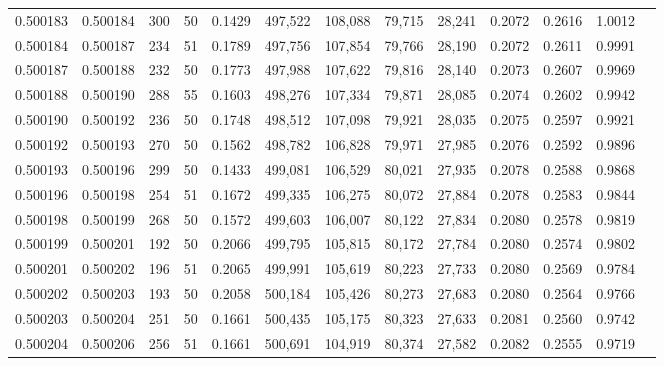 \begin{tabular}{rrrrrrrrrrrrr}
0.500183 & 0.500184 & 300 &  50 &                                     0.1429 & 497,522 & 108,088 &  79,715 &  28,241 & 0.2072 & 0.2616 & 1.0012 \\
0.500184 & 0.500187 & 234 &  51 &                                     0.1789 & 497,756 & 107,854 &  79,766 &  28,190 & 0.2072 & 0.2611 & 0.9991 \\
0.500187 & 0.500188 & 232 &  50 &                                     0.1773 & 497,988 & 107,622 &  79,816 &  28,140 & 0.2073 & 0.2607 & 0.9969 \\
0.500188 & 0.500190 & 288 &  55 &                                     0.1603 & 498,276 & 107,334 &  79,871 &  28,085 & 0.2074 & 0.2602 & 0.9942 \\
0.500190 & 0.500192 & 236 &  50 &                                     0.1748 & 498,512 & 107,098 &  79,921 &  28,035 & 0.2075 & 0.2597 & 0.9921 \\
0.500192 & 0.500193 & 270 &  50 &                                     0.1562 & 498,782 & 106,828 &  79,971 &  27,985 & 0.2076 & 0.2592 & 0.9896 \\
0.500193 & 0.500196 & 299 &  50 &                                     0.1433 & 499,081 & 106,529 &  80,021 &  27,935 & 0.2078 & 0.2588 & 0.9868 \\
0.500196 & 0.500198 & 254 &  51 &                                     0.1672 & 499,335 & 106,275 &  80,072 &  27,884 & 0.2078 & 0.2583 & 0.9844 \\
0.500198 & 0.500199 & 268 &  50 &                                     0.1572 & 499,603 & 106,007 &  80,122 &  27,834 & 0.2080 & 0.2578 & 0.9819 \\
0.500199 & 0.500201 & 192 &  50 &                                     0.2066 & 499,795 & 105,815 &  80,172 &  27,784 & 0.2080 & 0.2574 & 0.9802 \\
0.500201 & 0.500202 & 196 &  51 &                                     0.2065 & 499,991 & 105,619 &  80,223 &  27,733 & 0.2080 & 0.2569 & 0.9784 \\
0.500202 & 0.500203 & 193 &  50 &                                     0.2058 & 500,184 & 105,426 &  80,273 &  27,683 & 0.2080 & 0.2564 & 0.9766 \\
0.500203 & 0.500204 & 251 &  50 &                                     0.1661 & 500,435 & 105,175 &  80,323 &  27,633 & 0.2081 & 0.2560 & 0.9742 \\
0.500204 & 0.500206 & 256 &  51 &                                     0.1661 & 500,691 & 104,919 &  80,374 &  27,582 & 0.2082 & 0.2555 & 0.9719 \\

\end{tabular}
